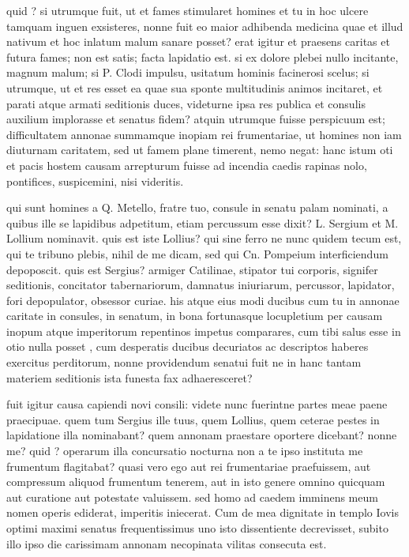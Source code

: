  quid ? si utrumque fuit, ut et fames stimularet homines et tu in hoc ulcere tamquam inguen exsisteres, nonne fuit eo maior adhibenda medicina quae et illud nativum et hoc inlatum malum sanare posset? erat igitur et praesens caritas et futura fames; non est satis; facta lapidatio est. si ex dolore plebei nullo incitante, magnum malum; si P. Clodi impulsu, usitatum hominis facinerosi scelus; si utrumque, ut et res esset ea quae sua sponte multitudinis animos incitaret, et parati atque armati seditionis duces, videturne ipsa res publica et consulis auxilium implorasse et senatus fidem? atquin utrumque fuisse perspicuum est; difficultatem annonae summamque inopiam rei frumentariae, ut homines non iam diuturnam caritatem, sed ut famem plane timerent, nemo negat: hanc istum oti et pacis hostem causam arrepturum fuisse ad incendia caedis rapinas nolo, pontifices, suspicemini, nisi videritis.

 qui sunt homines a Q. Metello, fratre tuo, consule in senatu palam nominati, a quibus ille se lapidibus adpetitum, etiam percussum esse dixit? L. Sergium et M. Lollium nominavit. quis est iste Lollius? qui sine ferro ne nunc quidem tecum est, qui te tribuno plebis, nihil de me dicam, sed qui Cn. Pompeium interficiendum depoposcit. quis est Sergius? armiger Catilinae, stipator tui corporis, signifer seditionis, concitator tabernariorum, damnatus iniuriarum, percussor, lapidator, fori depopulator, obsessor curiae. his atque eius modi ducibus cum tu in annonae caritate in consules, in senatum, in bona fortunasque locupletium per causam inopum atque imperitorum repentinos impetus comparares, cum tibi salus esse in otio nulla posset , cum desperatis ducibus decuriatos ac descriptos haberes exercitus perditorum, nonne providendum senatui fuit ne in hanc tantam materiem seditionis ista funesta fax adhaeresceret?

 fuit igitur causa capiendi novi consili: videte nunc fuerintne partes meae paene praecipuae. quem tum Sergius ille tuus, quem Lollius, quem ceterae pestes in lapidatione illa nominabant? quem annonam praestare oportere dicebant? nonne me? quid ? operarum illa concursatio nocturna non a te ipso instituta me frumentum flagitabat? quasi vero ego aut rei frumentariae praefuissem, aut compressum aliquod frumentum tenerem, aut in isto genere omnino quicquam aut curatione aut potestate valuissem. sed homo ad caedem imminens meum nomen operis ediderat, imperitis iniecerat. Cum de mea dignitate in templo Iovis optimi maximi senatus frequentissimus uno isto dissentiente decrevisset, subito illo ipso die carissimam annonam necopinata vilitas consecuta est.

